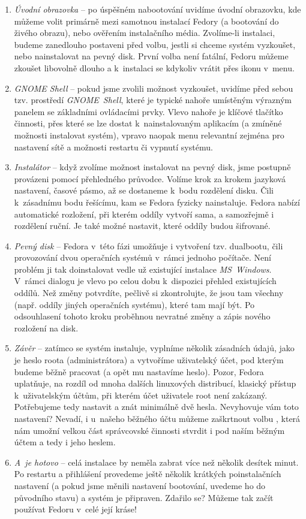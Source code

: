 \begin{enumerate}
\item\emph{Úvodní obrazovka} -- po úspěšném nabootování uvidíme úvodní obrazovku, kde můžeme volit primárně mezi samotnou instalací Fedory (a bootování do živého obrazu), nebo ověřením instalačního média. Zvolíme-li instalaci, budeme zanedlouho postaveni před volbu, jestli si chceme systém vyzkoušet, nebo nainstalovat na pevný disk. První volba není fatální, Fedoru můžeme zkoušet libovolně dlouho a k~instalaci se kdykoliv vrátit přes ikonu v~menu.

\pagebreak

\item\emph{GNOME Shell} -- pokud jsme zvolili možnost vyzkoušet, uvidíme před sebou tzv. prostředí \emph{GNOME~Shell}, které je typické nahoře umístěným výrazným panelem se základními ovládacími prvky. Vlevo nahoře je klíčové tlačítko činnosti, přes které se lze dostat k~nainstalovaným aplikacím (a zmíněné možnosti instalovat systém), vpravo naopak menu relevantní zejména pro nastavení sítě a možnosti restartu či vypnutí systému.

\item\emph{Instalátor} -- když zvolíme možnost instalovat na pevný disk, jsme postupně provázeni pomocí přehledného průvodce. Volíme krok za krokem jazyková nastavení, časové pásmo, až se dostaneme k~bodu rozdělení disku. Čili k~zásadnímu bodu řešícímu, kam se Fedora fyzicky nainstaluje. Fedora nabízí automatické rozložení, při kterém oddíly vytvoří sama, a samozřejmě i rozdělení ruční. Je také možné nastavit, které oddíly budou šifrované.

\item\emph{Pevný disk} -- Fedora v~této fázi umožňuje i vytvoření tzv. dualbootu, čili provozování dvou operačních systémů v~rámci jednoho počítače. Není problém ji tak doinstalovat vedle už existující instalace \emph{MS~Windows}. V~rámci dialogu je vlevo po celou dobu k~dispozici přehled existujících oddílů. Než změny potvrdíte, pečlivě si zkontrolujte, že jsou tam všechny (např. oddíly jiných operačních systému), které tam mají být. Po odsouhlasení tohoto kroku proběhnou nevratné změny a zápis nového rozložení na disk.

\item\emph{Závěr} -- zatímco se systém instaluje, vyplníme několik zásadních údajů, jako je heslo roota (administrátora) a vytvoříme uživatelský účet, pod kterým budeme běžně pracovat (a opět mu nastavíme heslo). Pozor, Fedora uplatňuje, na rozdíl od mnoha dalších linuxových distribucí, klasický přístup k~uživatelským účtům, při kterém účet uživatele root není zakázaný. Potřebujeme tedy nastavit a znát minimálně dvě hesla. Nevyhovuje vám toto nastavení? Nevadí, i u~našeho běžného účtu můžeme zaškrtnout volbu , která nám umožní velkou část správcovské činnosti stvrdit i pod naším běžným účtem a tedy i jeho heslem.

\item\emph{A~je hotovo} -- celá instalace by neměla zabrat více než několik desítek minut. Po restartu a přihlášení provedeme ještě několik krátkých poinstalačních nastavení (a pokud jsme měnili nastavení bootování, uvedeme ho do původního stavu) a systém je připraven. Zdařilo se? Můžeme tak začít používat Fedoru v~celé její kráse!
\end{enumerate}
